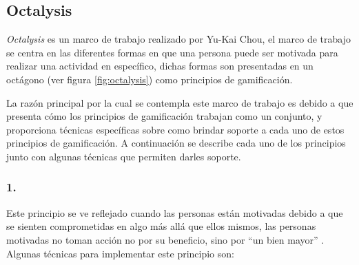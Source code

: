 \subsection{Octalysis}
\label{sec:octalysis}

 {\it Octalysis} es un marco de trabajo realizado por Yu-Kai Chou, el marco de trabajo
 se centra en las diferentes formas en que una persona puede ser motivada para realizar
 una actividad en específico, dichas formas son presentadas en un octágono (ver figura
 \ref{fig:octalysis}) como principios de gamificación.\\



 \noindent La razón principal por la cual se contempla este marco de trabajo es
 debido a que presenta cómo los principios de gamificación trabajan como un conjunto,
 y proporciona técnicas específicas sobre como brindar soporte a cada uno de estos
 principios de gamificación. A continuación se describe cada uno de los principios
 junto con algunas técnicas que permiten darles soporte.

\subsubsection{1. \principioI} \label{subsec:principioI}

 Este principio se ve reflejado cuando las personas están motivadas debido a que se
 sienten comprometidas en algo más allá que ellos mismos, las personas motivadas no toman acción
 no por su beneficio, sino por ``un bien mayor'' \cite[p. 66, 69]{Octalysis}. Algunas técnicas
 para implementar este principio son:

